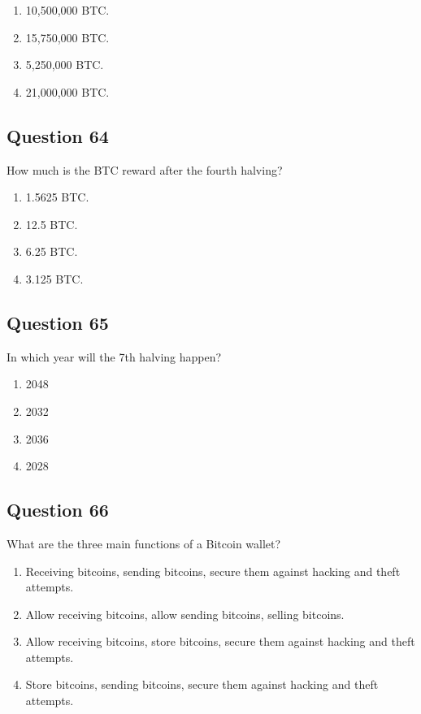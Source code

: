 \documentclass[12pt,a4paper]{article}
\begin{document}
\begin{enumerate}[label=\Alph*., leftmargin=*]
\item 10,500,000 BTC.
\item 15,750,000 BTC.
\item 5,250,000 BTC.
\item 21,000,000 BTC.
\end{enumerate}

\bigskip


\subsection*{Question 64}
How much is the BTC reward after the fourth halving?

\begin{enumerate}[label=\Alph*., leftmargin=*]
\item 1.5625 BTC.
\item 12.5 BTC.
\item 6.25 BTC.
\item 3.125 BTC.
\end{enumerate}

\bigskip


\subsection*{Question 65}
In which year will the 7th halving happen?

\begin{enumerate}[label=\Alph*., leftmargin=*]
\item 2048
\item 2032
\item 2036
\item 2028
\end{enumerate}

\bigskip


\subsection*{Question 66}
What are the three main functions of a Bitcoin wallet?

\begin{enumerate}[label=\Alph*., leftmargin=*]
\item Receiving bitcoins, sending bitcoins, secure them against hacking and theft attempts.
\item Allow receiving bitcoins, allow sending bitcoins, selling bitcoins.
\item Allow receiving bitcoins, store bitcoins, secure them against hacking and theft attempts.
\item Store bitcoins, sending bitcoins, secure them against hacking and theft attempts.
\end{enumerate}
\end{document}
